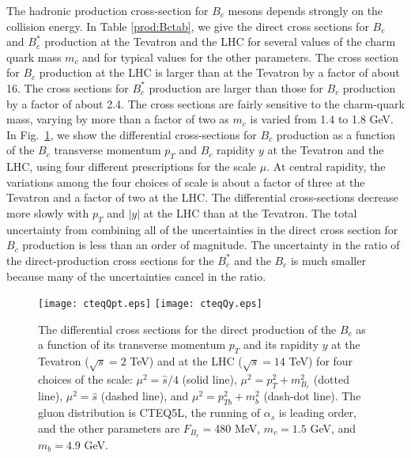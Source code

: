 The hadronic production cross-section for $B_c$ mesons depends strongly
on the collision energy. In Table \ref{prod:Bctab}, we give the direct
cross sections for $B_c$ and $B_c^*$  production at the Tevatron and the
LHC for several values of the charm quark mass $m_c$ and for typical
values for the other parameters. The cross section for $B_c$ production
at the LHC is larger than at the Tevatron by a factor of about 16. The
cross sections for $B_c^*$ production are larger than those for $B_c$
production by a factor of about 2.4. The cross sections are fairly
sensitive to the charm-quark mass, varying by more than a factor of two
as $m_c$ is varied from 1.4 to 1.8 GeV. In Fig.~\ref{prod:Bcfig}, we
show the differential cross-sections for $B_c$ production as a function
of the $B_c$ transverse momentum $p_T$ and $B_c$ rapidity $y$ at the
Tevatron and the LHC, using four different prescriptions for the scale
$\mu$. At central rapidity, the variations among the four choices of
scale is about a factor of three at the Tevatron and a factor of two at
the LHC. The differential cross-sections decrease more slowly with $p_T$
and $|y|$ at the LHC than at the Tevatron. The total uncertainty from
combining all of the uncertainties in the direct cross section for $B_c$
production is less than an order of magnitude. The uncertainty in the
ratio of the direct-production cross sections for the $B_c^*$  and the
$B_c$ is much smaller because many of the uncertainties cancel in the
ratio.

\begin{figure}
\centering
\hfill\texttt{[image: cteqQpt.eps]}%
\texttt{[image: cteqQy.eps]}\hspace*{\fill}
\caption{
The differential cross sections for the direct production
of the $B_c$ as a function of its
transverse momentum $p_T$ and its rapidity $y$ 
at the Tevatron ($\sqrt{s}=2$ TeV) and at the LHC
($\sqrt{s}=14$ TeV) for four choices of the scale:
$\mu^2=\hat{s}/4$ (solid line), 
$\mu^2=p_{T}^2+m_{B_c}^2$ (dotted line),
$\mu^2=\hat{s}$ (dashed line),
and $\mu^2=p_{Tb}^2+m_b^2$ (dash-dot line).
The gluon distribution is CTEQ5L, 
the running of $\alpha_s$ is leading order, 
and the other parameters are $F_{B_c}=480$ MeV, $m_c=1.5$ GeV, 
and $m_b=4.9$ GeV.} 
\label{prod:Bcfig}
\end{figure}

